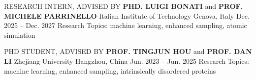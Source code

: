 


\begin{cventries}

\cventry
  {RESEARCH INTERN, ADVISED BY \textbf{PHD. LUIGI BONATI} and \textbf{PROF. MICHELE PARRINELLO}}
  {Italian Institute of Technology}
  {Genova, Italy}
  {Dec. 2025 -- Dec. 2027}
  {Research Topics: machine learning, enhanced sampling, atomic simulation}

\end{cventries}

\begin{cventries}

\cventry
  {PHD STUDENT, ADVISED BY \textbf{PROF. TINGJUN HOU} and \textbf{PROF. DAN LI}}
  {Zhejiang University}
  {Hangzhou, China}
  {Jun. 2023 -- Jun. 2025}
  {Research Topics: machine learning, enhanced sampling, intrinsically disordered proteins}

\end{cventries}
